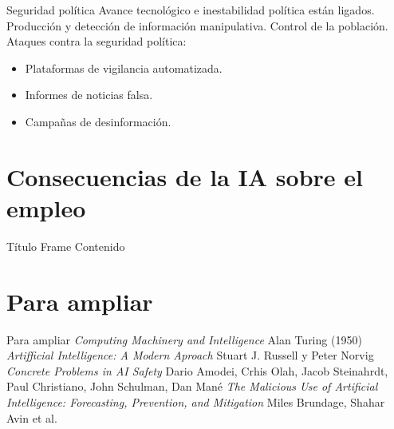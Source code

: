 \documentclass{beamer}
\begin{document}
\begin{frame}{Seguridad política}
Avance tecnológico e inestabilidad política están ligados.
\newline
\newline
Producción y detección de información manipulativa.
\newline
\newline
Control de la población.
\newline
\newline
Ataques contra la seguridad política:
\begin{itemize}
\item Plataformas de vigilancia automatizada.
\item Informes de noticias falsa.
\item Campañas de desinformación.
\end{itemize}
\end{frame}

\section{Consecuencias de la IA sobre el empleo}
\begin{frame}{Título Frame}
Contenido
\end{frame}

\section{Para ampliar}
\begin{frame}{Para ampliar}
\textit{Computing Machinery and Intelligence} Alan Turing (1950)
\newline
\newline
\textit{Artifficial Intelligence: A Modern Aproach} Stuart J. Russell y Peter Norvig
\newline
\newline
\textit{Concrete Problems in AI Safety} Dario Amodei, Crhis Olah, Jacob Steinahrdt, Paul Christiano, John Schulman, Dan Mané
\newline
\newline
\textit{The Malicious Use of Artificial Intelligence: Forecasting, Prevention, and Mitigation} Miles Brundage, Shahar Avin et al.
\end{frame}
\end{document}
